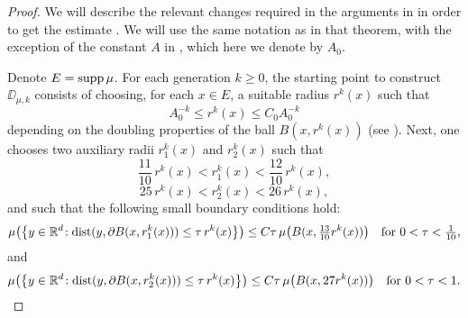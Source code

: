 \begin{proof}
	We will describe the relevant changes required in the arguments in \cite[Theorem 3.2]{David-Mattila} in order to get the estimate . We will
	use the same notation as in that theorem, with the exception of the constant $A$ in \cite[Theorem 3.2]{David-Mattila}, which here we denote by $A_0$. 
	
	Denote $E=\operatorname{supp}\mu$.
	For each generation $k\geq 0$, the starting point to construct $\DD_{\mu,k}$
	consists of choosing, for each $x\in E$, a suitable radius $r^k(x)$ such that
	\begin{equation}\label{eqrk1}
		A_0^{-k}\leq r^k(x)\leq C_0 A_0^{-k}
	\end{equation}
	depending on the doubling properties of the ball $B(x,r^k(x))$ (see \cite[(3.17)-(3.20)]{David-Mattila}).
	Next, one chooses two auxiliary radii $r_1^k(x)$ and $r_2^k(x)$ such that
	$$\frac{11}{10}\,r^k(x) < r_1^k(x)<\frac{12}{10}\,r^k(x),$$
	$$25\,r^k(x) < r_2^k(x)<26\,r^k(x),$$
	and such that the following small boundary conditions hold:
	\begin{equation}\label{eqthin1*}
		\mu\big(\big\{y\in{\mathbb R}^{d}\!: {\rm dist}(y,\partial B(x,r_1^k(x)))\leq \tau\,r^k(x)\big\}\big)
		\leq C\tau\,\mu\big(B(x,\tfrac{13}{10}r^k(x))\big)\quad
		\mbox{for $0<\tau < \tfrac1{10}$,}
	\end{equation}
	and
	\begin{equation}\label{eqthin2*}
		\mu\big(\big\{y\in{\mathbb R}^{d}\!: {\rm dist}(y,\partial B(x,r_2^k(x)))\leq \tau\,r^k(x)\big\}\big)
		\leq C\tau\,\mu\big(B(x,27r^k(x))\big)\quad
		\mbox{for $0<\tau < 1$.}
	\end{equation}
	

\end{proof}
